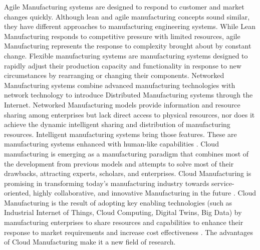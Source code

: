Agile Manufacturing systems are designed to respond to customer and market changes quickly. Although lean and agile manufacturing concepts sound similar, they have different approaches to manufacturing engineering systems. While Lean Manufacturing responds to competitive pressure with limited resources, agile Manufacturing represents the response to complexity brought about by constant change. Flexible manufacturing systems are manufacturing systems designed to rapidly adjust their production capacity and functionality in response to new circumstances by rearranging or changing their components. Networked Manufacturing systems combine advanced manufacturing technologies with network technology to introduce Distributed Manufacturing systems through the Internet. Networked Manufacturing models provide information and resource sharing among enterprises but lack direct access to physical resources, nor does it achieve the dynamic intelligent sharing and distribution of manufacturing resources. Intelligent manufacturing systems bring those features. These are manufacturing systems enhanced with human-like capabilities \parencite{chituc2009challenges}. Cloud manufacturing is emerging as a manufacturing paradigm that combines most of the development from previous models and attempts to solve most of their drawbacks, attracting experts, scholars, and enterprises. Cloud Manufacturing is promising in transforming today’s manufacturing industry towards service-oriented, highly collaborative, and innovative Manufacturing in the future \parencite{ren_cloud_2017}. Cloud Manufacturing is the result of adopting key enabling technologies (such as Industrial Internet of Things, Cloud Computing, Digital Twins, Big Data) by manufacturing enterprises to share resources and capabilities to enhance their response to market requirements and increase cost effectiveness \parencite{ren_cloud_2015}. The advantages of Cloud Manufacturing make it a new field of research.

